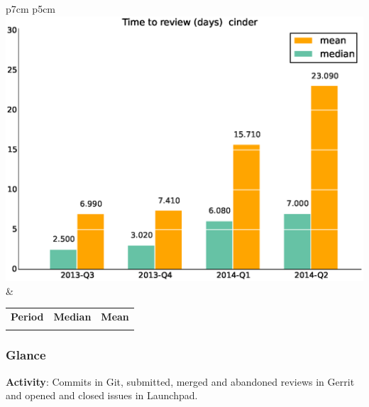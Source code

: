 \documentclass[a4wide,11pt]{report}
\begin{document}
\begin{tabular}{p{7cm} p{5cm}}
    \vspace{0pt} 
    \includegraphics[scale=.35]{figs/timetoreview_mediancinder.eps}
    & 
    \vspace{0pt}
    \begin{tabular}{l|r|r|}%
    \bfseries Period & \bfseries Median & \bfseries Mean %
    \csvreader[head to column names]{data/timetoreview_mediancinder.csv}{}%
    {\\ & \mediantime & \meantime}
    \end{tabular}
\end{tabular}


 \newpage 
 \subsubsection{Glance}

\textbf{Activity}: Commits in Git, submitted, merged and abandoned reviews in Gerrit and opened and closed issues in Launchpad.
\end{document}
